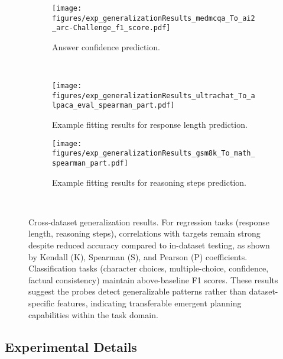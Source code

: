 \begin{figure*}[tb!]
\begin{subfigure}[b]{0.32\linewidth}
    \end{subfigure}
    \hfill
    \setcounter{mycounter}{6}
    \begin{subfigure}[b]{0.32\linewidth}
        \centering
        \texttt{[image: figures/exp\_generalizationResults\_medmcqa\_To\_ai2\_arc-Challenge\_f1\_score.pdf]}
        \vspace{-15pt}
        \caption{Answer confidence prediction.}
        \label{fig:exp_answer_confidence_crossDataset}
    \end{subfigure}
    \\
    \setcounter{mycounter}{7}
    \begin{subfigure}[b]{0.49\linewidth}
        \centering
        \texttt{[image: figures/exp\_generalizationResults\_ultrachat\_To\_alpaca\_eval\_spearman\_part.pdf]}
        \caption{Example fitting results for response length prediction.}
        \label{fig:exp_response_length_crossDataset}
    \end{subfigure}
    \hfill  %
    \setcounter{mycounter}{8}
    \begin{subfigure}[b]{0.48\linewidth}
        \centering
        \vspace{2pt}
        \texttt{[image: figures/exp\_generalizationResults\_gsm8k\_To\_math\_spearman\_part.pdf]}
        \caption{Example fitting results for reasoning steps prediction.}
        \label{fig:exp_reasoning_steps_crossDataset}
    \end{subfigure}
    \\
    \vspace{-8pt}
    \caption{\label{fig:exp_crossDataset} Cross-dataset generalization results. For regression tasks (response length, reasoning steps), correlations with targets remain strong despite reduced accuracy compared to in-dataset testing, as shown by Kendall (K), Spearman (S), and Pearson (P) coefficients. Classification tasks (character choices, multiple-choice, confidence, factual consistency) maintain above-baseline F1 scores. These results suggest the probes detect generalizable patterns rather than dataset-specific features, indicating transferable emergent planning capabilities within the task domain.}
    \vspace{-4pt}
\end{figure*}

    
    \subsection{Experimental Details}\label{subsec:experimental=details}
